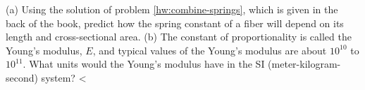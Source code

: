 (a) Using the solution of problem \ref{hw:combine-springs}, which is given
in the back of the book, predict how the spring constant of
a fiber will depend on its length and cross-sectional area.\hwendpart
(b) The constant of proportionality is called the Young's modulus, $E$, and typical values of the
Young's modulus are about $10^{10}$  to $10^{11}$. What
units would the Young's modulus have in the SI (meter-kilogram-second) system? <%
